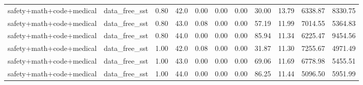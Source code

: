 \begin{table}[H]
{\begin{tabular}{llllrrrrrrr}
safety+math+code+medical & data\_free\_sst & 0.80 & 42.0 & 0.00 & 0.00 & 0.00 & 30.00 & 13.79 & 6338.87 & 8330.75 \\
safety+math+code+medical & data\_free\_sst & 0.80 & 43.0 & 0.08 & 0.00 & 0.00 & 57.19 & 11.99 & 7014.55 & 5364.83 \\
safety+math+code+medical & data\_free\_sst & 0.80 & 44.0 & 0.00 & 0.00 & 0.00 & 85.94 & 11.34 & 6225.47 & 9454.56 \\
safety+math+code+medical & data\_free\_sst & 1.00 & 42.0 & 0.08 & 0.00 & 0.00 & 31.87 & 11.30 & 7255.67 & 4971.49 \\
safety+math+code+medical & data\_free\_sst & 1.00 & 43.0 & 0.00 & 0.00 & 0.00 & 69.06 & 11.69 & 6778.98 & 5455.51 \\
safety+math+code+medical & data\_free\_sst & 1.00 & 44.0 & 0.00 & 0.00 & 0.00 & 86.25 & 11.44 & 5096.50 & 5951.99 \\
\bottomrule
\end{tabular}
}
\end{table}